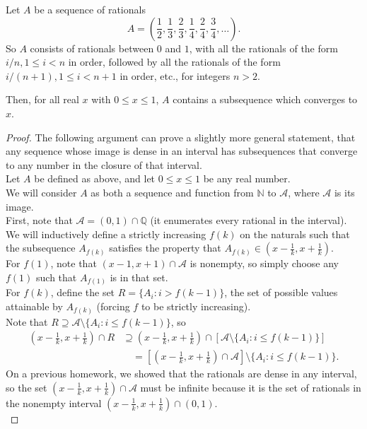 \documentclass{article}
\newenvironment{theorem}[1]{\renewcommand\theinnercustomthm{#1}\innercustomthm}
  {\endinnercustomthm}
\begin{document}
\newpage{}
\begin{theorem}{2}
    Let $A$ be a sequence of rationals 
    \[A = \left(\frac{1}{2},\frac{1}{3},\frac{2}{3},\frac{1}{4},\frac{2}{4},\frac{3}{4},\dots\right).\]
    So $A$ consists of rationals between $0$ and $1$, with all the rationals of the form $i/n, 1\le i < n$ in order, followed by all the rationals of the form $i/(n+1),1\le i< n+1$ in order, etc., for integers $n>2$.

    Then, for all real $x$ with $0 \le x \le 1$, $A$ contains a subsequence which converges to $x$.
\end{theorem}
\begin{proof}
    The following argument can prove a slightly more general statement, that any sequence whose image is dense in an interval has subsequences that converge to any number in the closure of that interval. \\
    Let $A$ be defined as above, and let $0 \le x \le 1$ be any real number. \\
    We will consider $A$ as both a sequence and function from $\mathbb N$ to $\mathcal A$, where $\mathcal A$ is its image.\\
    First, note that $\mathcal A=(0,1)\cap \mathbb Q$ (it enumerates every rational in the interval). \\
    We will inductively define a strictly increasing $f(k)$ on the naturals such that the subsequence $A_{f(k)}$ satisfies the property that $A_{f(k)} \in \left(x-\frac{1}{k},x+\frac{1}{k}\right)$. \\
    For $f(1)$, note that $(x-1,x+1)\cap \mathcal A$ is nonempty, so simply choose any $f(1)$ such that $A_{f(1)}$ is in that set. \\
    For $f(k)$, define the set $R=\{A_i : i > f(k-1)\}$, the set of possible values attainable by $A_{f(k)}$ (forcing $f$ to be strictly increasing). \\
    Note that $R \supseteq \mathcal A \setminus \{A_i : i \le f(k-1)\}$, so \begin{align}\left(x-\tfrac{1}{k},x+\tfrac{1}{k}\right)\cap R &\supseteq \left(x-\tfrac{1}{k},x+\tfrac{1}{k}\right)\cap \left[\mathcal A\setminus \{A_i : i \le f(k-1) \}\right] \nonumber \\&\quad = \left[\left(x-\tfrac{1}{k},x+\tfrac{1}{k}\right)\cap \mathcal A\right] \setminus \{A_i : i \le f(k-1)\}. \label{eq}\end{align}
    On a previous homework, we showed that the rationals are dense in any interval, so the set $\left(x-\frac{1}{k},x+\frac{1}{k}\right)\cap \mathcal A$ must be infinite because it is the set of rationals in the nonempty interval $\left(x-\frac{1}{k},x+\frac{1}{k}\right)\cap (0,1)$. \\

\end{proof}
\end{document}
